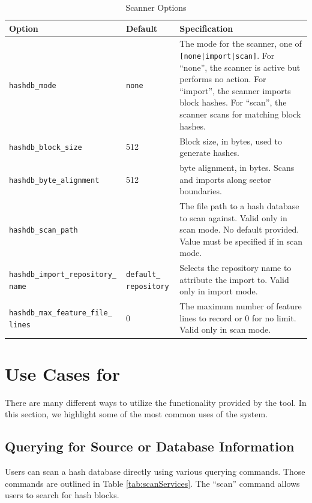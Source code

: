 \documentclass[11pt,fleqn]{article} %
\begin{document}
\begin{table}[!ht]

\centering
\caption{\bulk \hdb Scanner Options}
\label{tab:hashdb_be_usage}
\begin{tabular}{|p{5 cm}|p{2.0 cm}|p{6.5 cm}|}
\hline \hline
\textbf{Option} & \textbf{Default} & \textbf{Specification} \\
\hline
\verb+hashdb_mode+ & \verb+none+ & The mode for the scanner, one of \verb+[none|import|scan]+. For ``none'', the scanner is active but performs no action. For ``import'', the scanner imports block hashes. For ``scan'', the scanner scans for matching block hashes.\\
\hline
\verb+hashdb_block_size+ &512 & Block size, in bytes, used to generate hashes.\\
\hline
\verb+hashdb_byte_alignment+ &512 & byte alignment, in bytes.  Scans and imports along sector boundaries.\\
\hline
\verb+hashdb_scan_path+ & & The file path to a hash database to scan against.  Valid only in scan mode. No default provided. Value must be specified if in scan mode.\\
\hline
\verb+hashdb_import_repository_+ \verb+name+ & \verb+default_+ \verb+repository+ &Selects the repository name to attribute the import to.  Valid only in import mode.\\
\hline
\verb+hashdb_max_feature_file_+ \verb+lines+ & 0 &The maximum number of feature lines to record or 0 for no limit.  Valid only in scan mode.\\
\hline
\end{tabular}
\end{table}

\section{Use Cases for \hdb}
\label{UseCases}
There are many different ways to utilize the functionality provided by the \hdb tool. In this section, we highlight some of the most common uses of the system.

\subsection{Querying for Source or Database Information}
 Users can scan a hash database directly using various querying commands. Those commands are outlined in Table \ref{tab:scanServices}.  The ``scan'' command allows users to search for hash blocks.\\
\end{document}
